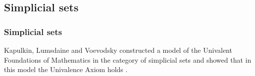 \documentclass[dvipdfmx]{beamer}
\begin{document}
%

\subsection{Simplicial sets}

\begin{frame}
  \frametitle{Simplicial sets}
  Kapulkin, Lumsdaine and Voevodsky constructed
  a model of the Univalent Foundations of Mathematics
  in the category of simplicial sets and
  showed that in this model
  the Univalence Axiom holds
  \cite{kapulkin2012simplicial,kapulkin2012univalence}.
\end{frame}
\end{document}
